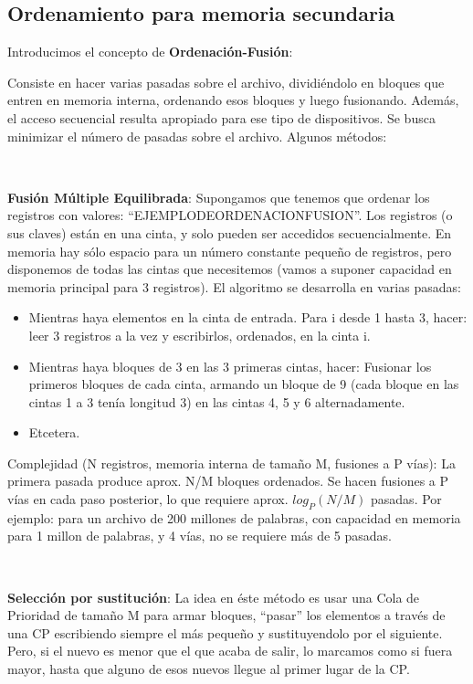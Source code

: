 \subsection{Ordenamiento para memoria secundaria}

Introducimos el concepto de \textbf{Ordenaci\'on-Fusi\'on}:

Consiste en hacer varias pasadas sobre el archivo, dividi\'endolo en bloques que entren en memoria interna, ordenando esos bloques y luego fusionando. Adem\'as, el acceso secuencial resulta apropiado para ese tipo de dispositivos. Se busca minimizar el n\'umero de pasadas sobre el archivo.
Algunos m\'etodos:

~

\textbf{Fusi\'on M\'ultiple Equilibrada}: Supongamos que tenemos que ordenar los registros con valores: ``EJEMPLODEORDENACIONFUSION''.
Los registros (o sus claves) est\'an en una cinta, y solo pueden ser accedidos secuencialmente. En memoria hay s\'olo espacio para un n\'umero constante pequeño de registros, pero disponemos de todas las cintas que necesitemos (vamos a suponer capacidad en memoria principal para 3 registros).
El algoritmo se desarrolla en varias pasadas:
 \begin{itemize}
  \item Mientras haya elementos en la cinta de entrada. Para i desde 1 hasta 3, hacer: leer 3 registros a la vez y escribirlos, ordenados, en la cinta i.
  \item Mientras haya bloques de 3 en las 3 primeras cintas, hacer: Fusionar los primeros bloques de cada cinta, armando un bloque de 9 (cada bloque en las cintas 1 a 3 ten\'ia longitud 3) en las cintas 4, 5 y 6 alternadamente.
  \item Etcetera.
 \end{itemize}

 Complejidad (N registros, memoria interna de tamaño M, fusiones a P v\'ias): La primera pasada produce aprox. N/M bloques ordenados. Se hacen fusiones a P v\'ias en cada paso posterior, lo que requiere aprox. $log_P(N/M)$ pasadas.
 Por ejemplo: para un archivo de 200 millones de palabras, con capacidad en memoria para 1 millon de palabras, y 4 v\'ias, no se requiere m\'as de 5 pasadas.

~

\textbf{Selecci\'on por sustituci\'on}: La idea en \'este m\'etodo es usar una Cola de Prioridad de tamaño M para armar bloques, ``pasar'' los elementos a trav\'es de una CP escribiendo siempre el m\'as pequeño y sustituyendolo por el siguiente. Pero, si el nuevo es menor que el que acaba de salir, lo marcamos como si fuera mayor, hasta que alguno de esos nuevos llegue al primer lugar de la CP.

